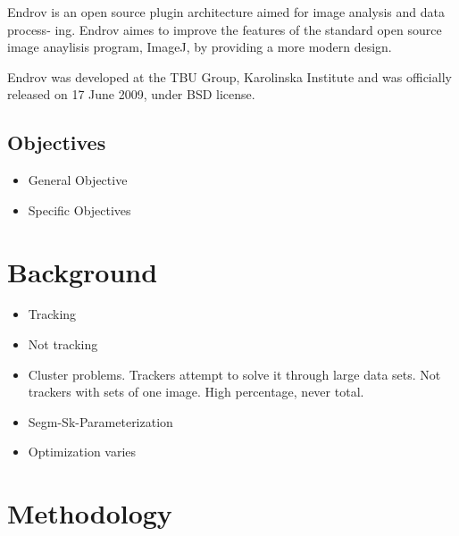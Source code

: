 \documentclass[12pt,letterpaper,oneside]{book}
\begin{document}
  Endrov is an open source plugin architecture aimed for image analysis and data process-
ing. Endrov aimes to improve the features of the standard open source image anaylisis
program, ImageJ, by providing a more modern design.


  Endrov was developed at the TBU Group, Karolinska Institute and was officially released
on 17 June 2009, under BSD license.


\subsection*{Objectives}
\begin{itemize}
\item General Objective
\item Specific Objectives
\end{itemize}

\section*{Background}
\begin{itemize}
\item Tracking
\item Not tracking
\item Cluster problems. Trackers attempt to solve it through
  large data sets. Not trackers with sets of one image. High
  percentage, never total.
\item Segm-Sk-Parameterization
\item Optimization varies
\end{itemize}

\section*{Methodology}
\end{document}
